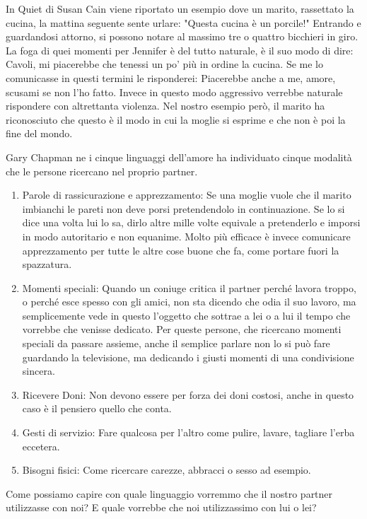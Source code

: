 \documentclass[12pt]{book} %
\begin{document}
In Quiet di Susan Cain viene riportato un esempio dove un marito,
rassettato la cucina, la mattina seguente sente urlare: "Questa cucina è un porcile!" Entrando e
guardandosi attorno, si possono notare al massimo tre o quattro bicchieri in giro. La foga di quei momenti per Jennifer
è del tutto naturale, è il suo modo di dire: Cavoli, mi piacerebbe che tenessi un po' più in ordine la cucina. Se me lo
comunicasse in questi termini le risponderei: Piacerebbe anche a me, amore, scusami se non l'ho fatto. Invece in questo
modo aggressivo verrebbe naturale rispondere con altrettanta violenza. Nel nostro esempio però, il marito ha
riconosciuto che questo è il modo in cui la moglie si esprime e che non è poi la fine del mondo.

Gary Chapman ne i cinque linguaggi dell'amore ha individuato cinque
modalità che le persone ricercano nel proprio partner.

\begin{enumerate}
\item Parole di rassicurazione e apprezzamento: Se una moglie vuole che il marito imbianchi le pareti non deve porsi
pretendendolo in continuazione. Se lo si dice una volta lui lo sa, dirlo altre mille volte equivale a pretenderlo e
imporsi in modo autoritario e non equanime. Molto più efficace è invece comunicare apprezzamento per tutte le altre
cose buone che fa, come portare fuori la spazzatura.
\item Momenti speciali: Quando un coniuge critica il partner perché lavora troppo, o perché esce spesso con gli amici,
non sta dicendo che odia il suo lavoro, ma semplicemente vede in questo l'oggetto che sottrae a
lei o a lui il tempo che vorrebbe che venisse dedicato. Per queste persone, che ricercano momenti speciali da passare
assieme, anche il semplice parlare non lo si può fare guardando la televisione, ma dedicando i giusti momenti di una
condivisione sincera.
\item Ricevere Doni: Non devono essere per forza dei doni costosi, anche in questo caso è il pensiero quello che conta.
\item Gesti di servizio: Fare qualcosa per l'altro come pulire, lavare, tagliare l'erba eccetera.
\item Bisogni fisici: Come ricercare carezze, abbracci o sesso ad esempio. 
\end{enumerate}
Come possiamo capire con quale linguaggio vorremmo che il nostro partner utilizzasse con noi? E quale vorrebbe che noi
utilizzassimo con lui o lei?
\end{document}
